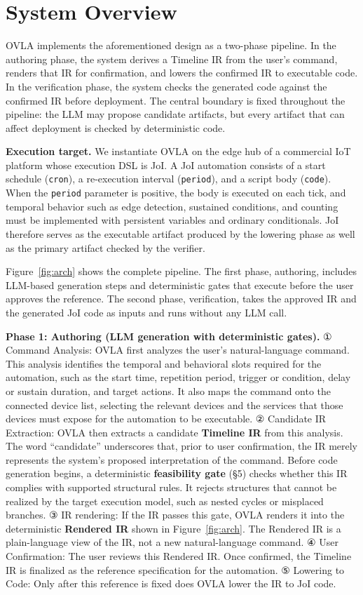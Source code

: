 \documentclass[sigconf,nonacm,anonymous,review]{acmart}
\begin{document}
\section{System Overview}

OVLA implements the aforementioned design as a two-phase pipeline. In the authoring phase, the system derives a Timeline IR from the user's command, renders that IR for confirmation, and lowers the confirmed IR to executable code. In the verification phase, the system checks the generated code against the confirmed IR before deployment. The central boundary is fixed throughout the pipeline: the LLM may propose candidate artifacts, but every artifact that can affect deployment is checked by deterministic code.

\textbf{Execution target.} We instantiate OVLA on the edge hub of a commercial IoT platform whose execution DSL is JoI. A JoI automation consists of a start schedule (\texttt{cron}), a re-execution interval (\texttt{period}), and a script body (\texttt{code}). When the \texttt{period} parameter is positive, the body is executed on each tick, and temporal behavior such as edge detection, sustained conditions, and counting must be implemented with persistent variables and ordinary conditionals. JoI therefore serves as the executable artifact produced by the lowering phase as well as the primary artifact checked by the verifier.

Figure~\ref{fig:arch} shows the complete pipeline. The first phase, authoring, includes LLM-based generation steps and deterministic gates that execute before the user approves the reference. The second phase, verification, takes the approved IR and the generated JoI code as inputs and runs without any LLM call.

\textbf{Phase 1: Authoring (LLM generation with deterministic gates).} ① Command Analysis: OVLA first analyzes the user's natural-language command. This analysis identifies the temporal and behavioral slots required for the automation, such as the start time, repetition period, trigger or condition, delay or sustain duration, and target actions. It also maps the command onto the connected device list, selecting the relevant devices and the services that those devices must expose for the automation to be executable. ② Candidate IR Extraction: OVLA then extracts a candidate \textbf{Timeline IR} from this analysis. The word ``candidate'' underscores that, prior to user confirmation, the IR merely represents the system's proposed interpretation of the command. Before code generation begins, a deterministic \textbf{feasibility gate} (\S5) checks whether this IR complies with supported structural rules. It rejects structures that cannot be realized by the target execution model, such as nested cycles or misplaced branches. ③ IR rendering: If the IR passes this gate, OVLA renders it into the deterministic \textbf{Rendered IR} shown in Figure~\ref{fig:arch}. The Rendered IR is a plain-language view of the IR, not a new natural-language command. ④ User Confirmation: The user reviews this Rendered IR. Once confirmed, the Timeline IR is finalized as the reference specification for the automation. ⑤ Lowering to Code: Only after this reference is fixed does OVLA lower the IR to JoI code.
\end{document}
